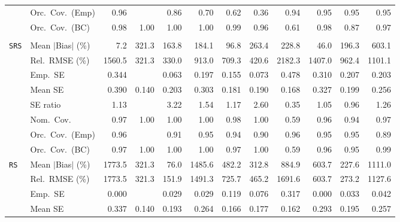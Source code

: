 \begin{landscape}
\begin{longtable}{llrrrrrrrrrr}
 & Orc.\ Cov.\ (Emp) & 0.96 &  & 0.86 & 0.70 & 0.62 & 0.36 & 0.94 & \cellcolor{rankthree}0.95 & \cellcolor{rankone}0.95 & \cellcolor{ranktwo}0.95 \\
 & Orc.\ Cov.\ (BC) & \cellcolor{rankthree}0.98 & 1.00 & 1.00 & 1.00 & 0.99 & \cellcolor{rankone}0.96 & 0.61 & 0.98 & 0.87 & \cellcolor{ranktwo}0.97 \\
\addlinespace[2pt]
\multicolumn{12}{l}{\textbf{Binary \& Categorical Phase-One Covariates}} \\
\addlinespace[2pt]
\quad \texttt{SRS} & Mean $|$Bias$|$ (\%) & \cellcolor{rankone}7.2 & 321.3 & 163.8 & 184.1 & \cellcolor{rankthree}96.8 & 263.4 & 228.8 & \cellcolor{ranktwo}46.0 & 196.3 & 603.1 \\
 & Rel.\ RMSE (\%) & 1560.5 & \cellcolor{rankone}321.3 & \cellcolor{ranktwo}330.0 & 913.0 & 709.3 & \cellcolor{rankthree}420.6 & 2182.3 & 1407.0 & 962.4 & 1101.1 \\
 & Emp.\ SE & 0.344 &  & 0.063 & 0.197 & 0.155 & 0.073 & 0.478 & 0.310 & 0.207 & 0.203 \\
 & Mean SE & 0.390 & 0.140 & 0.203 & 0.303 & 0.181 & 0.190 & 0.168 & 0.327 & 0.199 & 0.256 \\
 & SE ratio & \cellcolor{rankthree}1.13 &  & 3.22 & 1.54 & 1.17 & 2.60 & 0.35 & \cellcolor{ranktwo}1.05 & \cellcolor{rankone}0.96 & 1.26 \\
 & Nom.\ Cov. & 0.97 & 1.00 & 1.00 & 1.00 & 0.98 & 1.00 & 0.59 & \cellcolor{rankone}0.96 & \cellcolor{ranktwo}0.94 & \cellcolor{rankthree}0.97 \\
 & Orc.\ Cov.\ (Emp) & 0.96 &  & 0.91 & \cellcolor{rankone}0.95 & 0.94 & 0.90 & 0.96 & \cellcolor{ranktwo}0.95 & \cellcolor{rankthree}0.95 & 0.89 \\
 & Orc.\ Cov.\ (BC) & \cellcolor{rankthree}0.97 & 1.00 & 1.00 & 1.00 & 0.97 & 1.00 & 0.59 & \cellcolor{ranktwo}0.96 & \cellcolor{rankone}0.95 & 0.99 \\
\addlinespace[2pt]
\quad \texttt{RS} & Mean $|$Bias$|$ (\%) & 1773.5 & 321.3 & \cellcolor{rankone}76.0 & 1485.6 & 482.2 & \cellcolor{rankthree}312.8 & 884.9 & 603.7 & \cellcolor{ranktwo}227.6 & 1111.0 \\
 & Rel.\ RMSE (\%) & 1773.5 & \cellcolor{rankthree}321.3 & \cellcolor{rankone}151.9 & 1491.3 & 725.7 & 465.2 & 1691.6 & 603.7 & \cellcolor{ranktwo}273.2 & 1127.6 \\
 & Emp.\ SE & 0.000 &  & 0.029 & 0.029 & 0.119 & 0.076 & 0.317 & 0.000 & 0.033 & 0.042 \\
 & Mean SE & 0.337 & 0.140 & 0.193 & 0.264 & 0.166 & 0.177 & 0.162 & 0.293 & 0.195 & 0.257 \\

\end{longtable}
\end{landscape}

